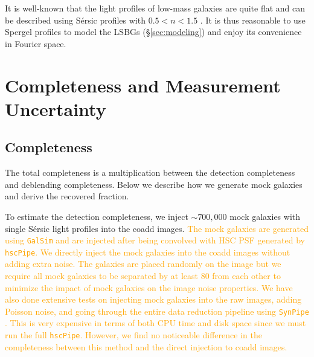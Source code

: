\documentclass[twocolumn,astrosymb,twocolappendix,linenumbers]{aastex631}
\newcommand{\emphasize}{\textcolor{orange}}
\newcommand{\code}[1]{\texttt{#1}}
\newcommand{\sersic}{S\'ersic}
\begin{document}
\begin{CJK*}{UTF8}{gbsn}
It is well-known that the light profiles of low-mass galaxies are quite flat and can be described using \sersic{} profiles with $0.5 < n < 1.5$ \citep[e.g.,][]{vanDokkum2015,Lange2015,Greco2018,Zaritsky2021,ELVES-I}. It is thus reasonable to use Spergel profiles to model the LSBGs (\S\ref{sec:modeling}) and enjoy its convenience in Fourier space. 

\section{Completeness and Measurement Uncertainty}\label{ap:comp_meas_unc}
\subsection{Completeness}
The total completeness is a multiplication between the detection completeness and deblending completeness. Below we describe how we generate mock galaxies and derive the recovered fraction. 

To estimate the detection completeness, we inject $\sim 700,000$ mock galaxies with single \sersic{} light profiles into the coadd images. \emphasize{The mock galaxies are generated using \texttt{GalSim} \citep{Rowe2015} and are injected after being convolved with HSC PSF generated by \code{hscPipe}. We directly inject the mock galaxies into the coadd images without adding extra noise. The galaxies are placed randomly on the image but we require all mock galaxies to be separated by at least 80\arcsec{} from each other to minimize the impact of mock galaxies on the image noise properties. We have also done extensive tests on injecting mock galaxies into the raw images, adding Poisson noise, and going through the entire data reduction pipeline using \code{SynPipe} \citep{Huang2018synpipe}. This is very expensive in terms of both CPU time and disk space since we must run the full \code{hscPipe}. However, we find no noticeable difference in the completeness between this method and the direct injection to coadd images.}


\end{CJK*}
\end{document}

